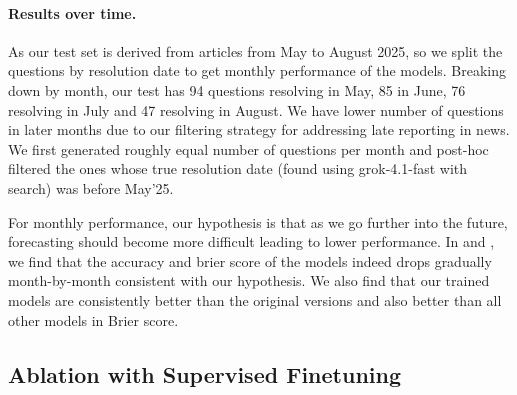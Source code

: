 \documentclass{article} %
\begin{document}
\paragraph{Results over time.} As our test set is derived from articles from May to August 2025, so we split the questions by resolution date to get monthly performance of the models. Breaking down by month, our test has 94 questions resolving in May, 85 in June, 76 resolving in July and 47 resolving in August. We have lower number of questions in later months due to our filtering strategy for addressing late reporting in news. We first generated roughly equal number of questions per month and post-hoc filtered the ones whose true resolution date (found using grok-4.1-fast with search) was before May'25. 

For monthly performance, our hypothesis is that as we go further into the future, forecasting should become more difficult leading to lower performance. In  and , we find that the accuracy and brier score of the models indeed drops gradually month-by-month consistent with our hypothesis. We also find that our trained models are consistently better than the original versions and also better than all other models in Brier score.




\subsection{Ablation with Supervised Finetuning}
\label{sec:sft_ablation}
\end{document}
